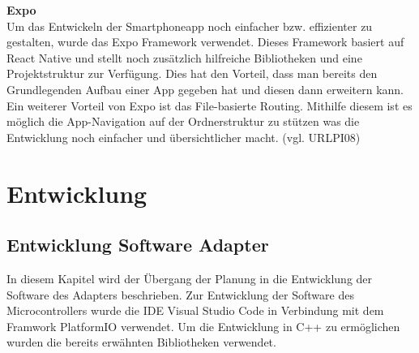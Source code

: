 \documentclass[]{article}
\begin{document}
\textbf{Expo} \\
Um das Entwickeln der Smartphoneapp noch einfacher bzw. effizienter zu gestalten, wurde das Expo Framework verwendet. Dieses Framework basiert auf React Native und stellt noch zusätzlich hilfreiche Bibliotheken und eine Projektstruktur zur Verfügung. Dies hat den Vorteil, dass man bereits den Grundlegenden Aufbau einer App gegeben hat und diesen dann erweitern kann. Ein weiterer Vorteil von Expo ist das File-basierte Routing. Mithilfe diesem ist es möglich die App-Navigation auf der Ordnerstruktur zu stützen was die Entwicklung noch einfacher und übersichtlicher macht.
(vgl. URLPI08)

\section{Entwicklung}
\subsection{Entwicklung Software Adapter}
In diesem Kapitel wird der Übergang der Planung in die Entwicklung der Software des Adapters beschrieben. 
Zur Entwicklung der Software des Microcontrollers wurde die IDE Visual Studio Code in Verbindung mit dem Framwork PlatformIO verwendet. Um die Entwicklung in C++ zu ermöglichen wurden die bereits erwähnten Bibliotheken verwendet.
\end{document}
